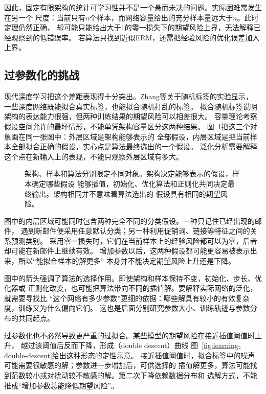 因此，固定有限架构的统计可学习性并不是一个悬而未决的问题。实际困难常发生在另一个
尺度：当前只有$n$个样本，而网络容量给出的充分样本量远大于$n$。此时定理仍然正确，
却可能只能给出大于1的零一损失下的期望风险上界，无法解释已经观察到的低错误率。
若算法只找到近似ERM，还需把经验风险的优化误差加入上界。

\subsection{过参数化的挑战}

现代深度学习把这个差距表现得十分突出。Zhang等关于随机标签的实验显示，
一些深度网络既能拟合真实标签，也能拟合随机打乱的标签。
拟合随机标签说明架构的表达能力很强，但两种训练结果的期望风险可以相差很大。
容量理论考察假设空间允许的最坏情形，不能单凭架构容量区分这两种结果。
图~\ref{fig:learning-deep-selection}把这三个对象画在同一张图中：外层区域是架构能够表示的
全部假设，内层区域是把当前样本全部拟合正确的假设，实心点是算法最终选出的一个假设。
泛化分析需要解释这个点在新输入上的表现，不能只观察外层区域有多大。

\begin{figure}[!htb]
 \centering
 
 \caption{架构、样本和算法分别限定不同对象。架构决定能够表示的假设，样本确定哪些假设
 能够插值，初始化、优化算法和正则化共同决定最终输出。架构相同并不意味着算法选出的
 假设具有相同的期望风险。}
 \label{fig:learning-deep-selection}
\end{figure}

图中的内层区域可能同时包含两种完全不同的分类假设。一种只记住已经出现的邮件，
遇到新邮件便采用任意默认分类；另一种利用促销词、链接等特征之间的关系预测类别。
采用零一损失时，它们在当前样本上的经验风险都可以为零，后者却可能在新邮件上继续有效。
增加参数以后，这两种假设都可能更容易被表示出来，所以“能拟合样本的解更多”
本身并不能决定期望风险上升还是下降。

图中的箭头强调了算法的选择作用。即使架构和样本保持不变，初始化、步长、优化器或
正则化改变，也可能把算法带向不同的插值解。要解释实际网络的泛化，就需要寻找比
“这个网络有多少参数”更细的依据：哪些解具有较小的有效复杂度，训练又为什么偏向它们。
这也是后面分别研究参数大小、训练轨迹与参数分布的共同起点。

过参数化也不必然导致更严重的过拟合。某些模型的期望风险在接近插值阈值时上升，
越过该阈值后反而下降，形成（double descent）曲线 图~\ref{fig:learning-double-descent}给出这种形态的定性示意。
接近插值阈值时，拟合标签中的噪声可能需要很敏感的解；参数进一步增加后，可供选择的
插值解更多，算法可能找到范数较小或对扰动较不敏感的解。第二次下降依赖数据分布和
选解方式，不能推成“增加参数总能降低期望风险”。


